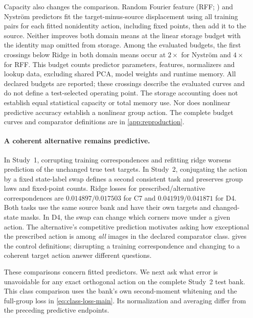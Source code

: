 Capacity also changes the comparison. Random Fourier feature (RFF; \citealp{rahimi2007random}) and Nystr\"om \citep{williams2000nystrom} predictors fit the target-minus-source displacement using all training pairs for each fitted nonidentity action, including fixed points, then add it to the source. Neither improves both domain means at the linear storage budget with the identity map omitted from storage. Among the evaluated budgets, the first crossings below Ridge in both domain means occur at $2\times$ for Nystr\"om and $4\times$ for RFF. This budget counts predictor parameters, features, normalizers and lookup data, excluding shared PCA, model weights and runtime memory. All declared budgets are reported; these crossings describe the evaluated curves and do not define a test-selected operating point. The storage accounting does not establish equal statistical capacity or total memory use. Nor does nonlinear predictive accuracy establish a nonlinear group action. The complete budget curves and comparator definitions are in \cref{app:reproduction}.

\paragraph{A coherent alternative remains predictive.}
In Study~1, corrupting training correspondences and refitting ridge worsens prediction of the unchanged true test targets. In Study~2, conjugating the action by a fixed state-label swap defines a second consistent task and preserves group laws and fixed-point counts. Ridge losses for prescribed/alternative correspondences are $0.014897/0.017503$ for C7 and $0.041919/0.041871$ for D4. Both tasks use the same source bank and have their own targets and changed-state masks. In D4, the swap can change which corners move under a given action. The alternative's competitive prediction motivates asking how exceptional the prescribed action is among \emph{all} images in the declared comparator class.  gives the control definitions; disrupting a training correspondence and changing to a coherent target action answer different questions.

These comparisons concern fitted predictors. We next ask what error is unavoidable for any exact orthogonal action on the complete Study~2 test bank. This class comparison uses the bank's own second-moment whitening and the full-group loss in \cref{eq:class-loss-main}. Its normalization and averaging differ from the preceding predictive endpoints.

